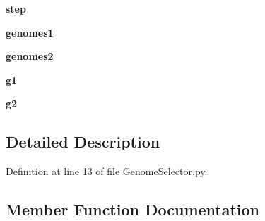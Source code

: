 \begin{DoxyCompactItemize}
\item 
{\bfseries step}\hypertarget{class_n_e_a_t___py_genetics_1_1_n_e_a_t_1_1_analyst_1_1_genome_selector_1_1_genome_selector_af8c8af7836b5ae5b52f6688c1266bb06}{}\label{class_n_e_a_t___py_genetics_1_1_n_e_a_t_1_1_analyst_1_1_genome_selector_1_1_genome_selector_af8c8af7836b5ae5b52f6688c1266bb06}

\item 
{\bfseries genomes1}\hypertarget{class_n_e_a_t___py_genetics_1_1_n_e_a_t_1_1_analyst_1_1_genome_selector_1_1_genome_selector_a2b86adfa98c72c3ce406e95fce29a9ad}{}\label{class_n_e_a_t___py_genetics_1_1_n_e_a_t_1_1_analyst_1_1_genome_selector_1_1_genome_selector_a2b86adfa98c72c3ce406e95fce29a9ad}

\item 
{\bfseries genomes2}\hypertarget{class_n_e_a_t___py_genetics_1_1_n_e_a_t_1_1_analyst_1_1_genome_selector_1_1_genome_selector_aff1676f8a3e91f03ef133d445fd111b8}{}\label{class_n_e_a_t___py_genetics_1_1_n_e_a_t_1_1_analyst_1_1_genome_selector_1_1_genome_selector_aff1676f8a3e91f03ef133d445fd111b8}

\item 
{\bfseries g1}\hypertarget{class_n_e_a_t___py_genetics_1_1_n_e_a_t_1_1_analyst_1_1_genome_selector_1_1_genome_selector_a66bc085d9c0e2b4ce121fd3c4d4ec226}{}\label{class_n_e_a_t___py_genetics_1_1_n_e_a_t_1_1_analyst_1_1_genome_selector_1_1_genome_selector_a66bc085d9c0e2b4ce121fd3c4d4ec226}

\item 
{\bfseries g2}\hypertarget{class_n_e_a_t___py_genetics_1_1_n_e_a_t_1_1_analyst_1_1_genome_selector_1_1_genome_selector_a335eeb80af660ac6ef6d5a8ca81fb95c}{}\label{class_n_e_a_t___py_genetics_1_1_n_e_a_t_1_1_analyst_1_1_genome_selector_1_1_genome_selector_a335eeb80af660ac6ef6d5a8ca81fb95c}

\end{DoxyCompactItemize}


\subsection{Detailed Description}


Definition at line 13 of file Genome\+Selector.\+py.



\subsection{Member Function Documentation}
